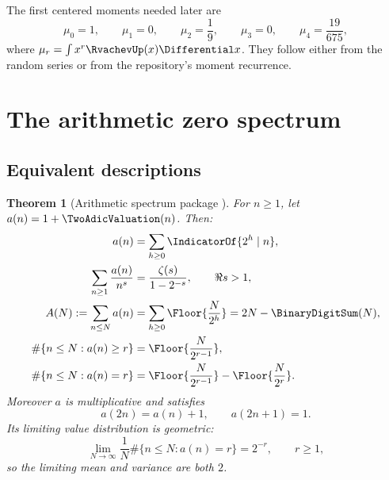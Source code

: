 \documentclass[11pt]{article}
\numberwithin{equation}{section}
\newtheorem{theorem}{Theorem}[section]
\theoremstyle{definition}
\theoremstyle{remark}
\begin{document}
The first centered moments needed later are
\begin{equation}
 \mu_0=1,\qquad \mu_1=0,\qquad \mu_2=\frac19,
 \qquad \mu_3=0,\qquad \mu_4=\frac{19}{675},               \label{p2:eq:moments}
\end{equation}
where $\mu_r=\int x^r\RvachevUp(x)\Differential x$.  They follow either from the random series or
from the repository's moment recurrence.

\section{The arithmetic zero spectrum}
\label{p2:sec:spectrum}

\subsection{Equivalent descriptions}

\begin{theorem}[Arithmetic spectrum package \NewResult]
\label{p2:thm:spectrum-package}
For $n\ge1$, let $a(n)=1+\TwoAdicValuation(n)$.  Then:
\begin{align}
 a(n)&=\sum_{h\ge0}\IndicatorOf{2^h\mid n},                  \label{p2:eq:a-divisor}\\
 \sum_{n\ge1}\frac{a(n)}{n^s}
   &=\frac{\zeta(s)}{1-2^{-s}},\qquad \Re s>1,             \label{p2:eq:D}\\
 A(N):=\sum_{n\le N}a(n)
   &=\sum_{h\ge0}\Floor{\frac{N}{2^h}}
     =2N-\BinaryDigitSum(N),                                           \label{p2:eq:AN}\\
 \#\{n\le N:a(n)\ge r\}
   &=\Floor{\frac{N}{2^{r-1}}},                            \label{p2:eq:tail-count}\\
 \#\{n\le N:a(n)=r\}
   &=\Floor{\frac{N}{2^{r-1}}}-
     \Floor{\frac{N}{2^r}}.                               \label{p2:eq:exact-count}
\end{align}
Moreover $a$ is multiplicative and satisfies
\begin{equation}
 a(2n)=a(n)+1,\qquad a(2n+1)=1.                            \label{p2:eq:a-rec}
\end{equation}
Its limiting value distribution is geometric:
\begin{equation}
 \lim_{N\to\infty}\frac1N\#\{n\le N:a(n)=r\}=2^{-r},
 \qquad r\ge1,                                            \label{p2:eq:geom}
\end{equation}
so the limiting mean and variance are both $2$.
\end{theorem}
\end{document}
